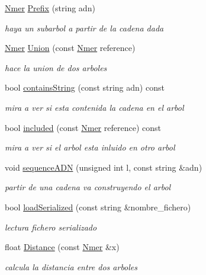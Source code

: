 \begin{DoxyCompactItemize}
\hyperlink{classNmer}{Nmer} \hyperlink{classNmer_adf184ca659cf3ce3f2db301acae40e56}{Prefix} (string adn)
\begin{DoxyCompactList}\small\item\em haya un subarbol a partir de la cadena dada \end{DoxyCompactList}\item 
\hyperlink{classNmer}{Nmer} \hyperlink{classNmer_a3d0bac5611cb1648e5b626a7f7c8e987}{Union} (const \hyperlink{classNmer}{Nmer} reference)
\begin{DoxyCompactList}\small\item\em hace la union de dos arboles \end{DoxyCompactList}\item 
bool \hyperlink{classNmer_a3aa6c3d317ab01bd6b8c53434f50d03f}{contains\+String} (const string adn) const 
\begin{DoxyCompactList}\small\item\em mira a ver si esta contenida la cadena en el arbol \end{DoxyCompactList}\item 
bool \hyperlink{classNmer_ac5af1362b3f8ef4141574e62bc3510ac}{included} (const \hyperlink{classNmer}{Nmer} reference) const 
\begin{DoxyCompactList}\small\item\em mira a ver si el arbol esta inluido en otro arbol \end{DoxyCompactList}\item 
void \hyperlink{classNmer_ae8871242f0e282d71e4c9b4685f468be}{sequence\+A\+DN} (unsigned int l, const string \&adn)
\begin{DoxyCompactList}\small\item\em partir de una cadena va construyendo el arbol \end{DoxyCompactList}\item 
bool \hyperlink{classNmer_a418c016bb6e04d2f699ddb694ee0221f}{load\+Serialized} (const string \&nombre\+\_\+fichero)
\begin{DoxyCompactList}\small\item\em lectura fichero serializado \end{DoxyCompactList}\item 
float \hyperlink{classNmer_a8df2f2f355423b02413e5e29dc5639e8}{Distance} (const \hyperlink{classNmer}{Nmer} \&x)
\begin{DoxyCompactList}\small\item\em calcula la distancia entre dos arboles \end{DoxyCompactList}\item 

\end{DoxyCompactItemize}
